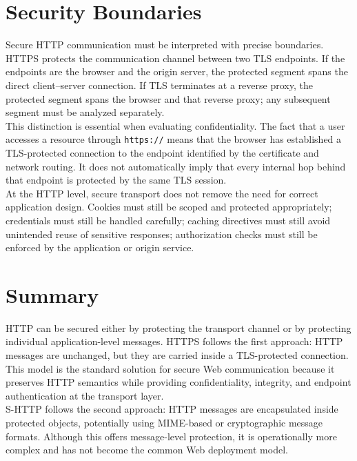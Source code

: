 \documentclass{scrbook}
\begin{document}
\section{Security Boundaries}

Secure HTTP communication must be interpreted with precise boundaries. HTTPS protects the communication channel between two TLS endpoints. If the endpoints are the browser and the origin server, the protected segment spans the direct client--server connection. If TLS terminates at a reverse proxy, the protected segment spans the browser and that reverse proxy; any subsequent segment must be analyzed separately.\\

This distinction is essential when evaluating confidentiality. The fact that a user accesses a resource through \texttt{https://} means that the browser has established a TLS-protected connection to the endpoint identified by the certificate and network routing. It does not automatically imply that every internal hop behind that endpoint is protected by the same TLS session.\\

At the HTTP level, secure transport does not remove the need for correct application design. Cookies must still be scoped and protected appropriately; credentials must still be handled carefully; caching directives must still avoid unintended reuse of sensitive responses; authorization checks must still be enforced by the application or origin service.

\section{Summary}

HTTP can be secured either by protecting the transport channel or by protecting individual application-level messages. HTTPS follows the first approach: HTTP messages are unchanged, but they are carried inside a TLS-protected connection. This model is the standard solution for secure Web communication because it preserves HTTP semantics while providing confidentiality, integrity, and endpoint authentication at the transport layer.\\

S-HTTP follows the second approach: HTTP messages are encapsulated inside protected objects, potentially using MIME-based or cryptographic message formats. Although this offers message-level protection, it is operationally more complex and has not become the common Web deployment model.\\
\end{document}
